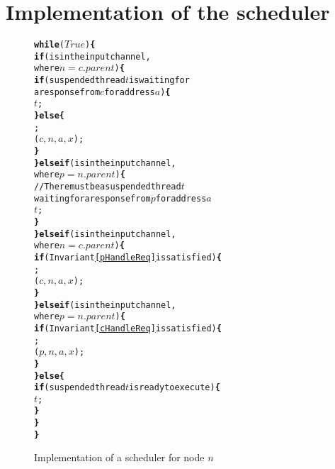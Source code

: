 \section{Implementation of the scheduler}
\label{sec:scheduler}

\newcommand{\lWhile}{\textbf{while}}
\newcommand{\lIf}{\textbf{if}}
\newcommand{\lElsIf}{\textbf{else if}}
\newcommand{\lElse}{\textbf{else}}
\newcommand{\bopen}{\textbf{\{}}
\newcommand{\bclose}{\textbf{\}}}


\begin{figure}
\begin{boxedminipage}{\linewidth}
\begin{alltt}
\normalfont
\lWhile{} (\(True\)) \bopen
      \lIf ( is in the input channel,
            where \(n = c.parent\)) \bopen
            \lIf (suspended thread \(t\) is waiting for 
                 a response from \(c\) for address \(a\)) \bopen
                   \resume{} \(t\);
            \bclose \lElse \bopen
                   \receive{} ;
                   \start{} \dRespL(\(c, n, a, x\));
            \bclose
      \bclose \lElsIf ( is in the input channel,
            where \(p = n.parent\)) \bopen
                   // There must be a suspended thread \(t\)
                   waiting for a response from \(p\) for address \(a\)
                   \resume{} \(t\);
            \bclose
      \bclose \lElsIf ( is in the input channel,
                     where \(n = c.parent\)) \bopen
             \lIf (Invariant \ref{pHandleReq} is satisfied) \bopen
                   \receive{} ;
                   \start{} \uReq(\(c, n, a, x\));
             \bclose
      \bclose \lElsIf ( is in the input channel,
                  where \(p = n.parent\)) \bopen
             \lIf (Invariant \ref{cHandleReq} is satisfied) \bopen
                   \receive{} ;
                   \start{} \dReq(\(p, n, a, x\));
             \bclose
      \bclose \lElse \bopen
             \lIf (suspended thread \(t\) is ready to execute) \bopen
                   \resume{} \(t\);
             \bclose
      \bclose
\bclose
\end{alltt}
\end{boxedminipage}
\caption{Implementation of a scheduler for node $n$}
\end{figure}

